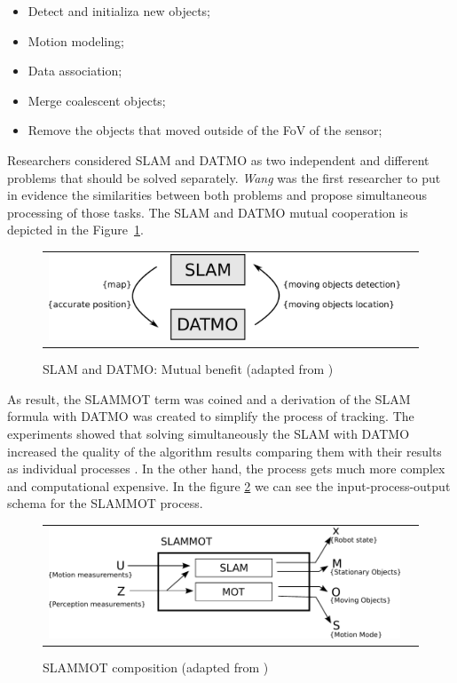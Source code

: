 \begin{itemize}
\item Detect and initializa new objects;
\item Motion modeling;
\item Data association;
\item Merge coalescent objects;
\item Remove the objects that moved outside of the FoV of the sensor;
\end{itemize}

Researchers considered SLAM and DATMO as two independent and different problems that should be solved separately. \textit{Wang} was the first researcher to put in evidence the similarities between both problems and propose simultaneous processing of those tasks\cite{Wang03onlinesimultaneous}. The SLAM and DATMO mutual cooperation is depicted in the Figure~\ref{fig:datmoslam:loop}.

\begin{figure}[h]
   \centering
     \begin{tabular}{lr}
       \includegraphics[scale=0.5]{img/fig:datmoslam:loop}
     \end{tabular}
   \caption{SLAM and DATMO: Mutual benefit (adapted from \cite{VU-2009-454238})}
   \label{fig:datmoslam:loop}
 \end{figure}

As result, the SLAMMOT term was coined and a derivation of the SLAM formula with DATMO was created to simplify the process of tracking. The experiments showed that solving simultaneously the SLAM with DATMO increased the quality of the algorithm results comparing them with their results as individual processes \cite{Wang02simultaneouslocalization}. In the other hand, the process gets much more complex and computational expensive. In the figure \ref{fig:slammot} we can see the input-process-output schema for the SLAMMOT process.

\begin{figure}[h]
   \centering
     \begin{tabular}{lr}
       \includegraphics[scale=0.9]{img/fig:slammot}
     \end{tabular}
   \caption{SLAMMOT composition (adapted from \cite{Wang04a})}
   \label{fig:slammot}
 \end{figure}

